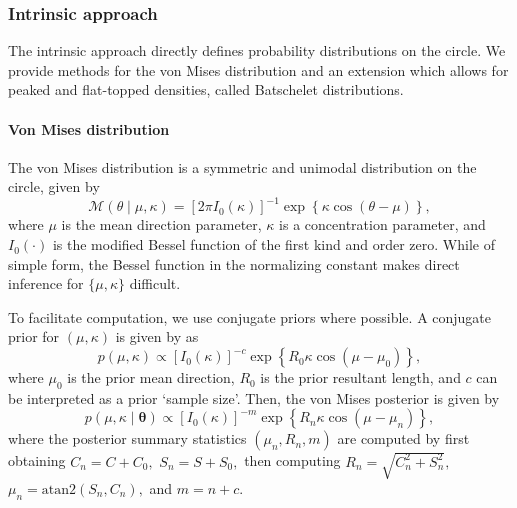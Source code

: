 \documentclass{article}
\begin{document}
\hypertarget{intrinsic-approach}{%
	\subsubsection{Intrinsic approach}\label{intrinsic-approach}}

\label{sec:intrinsic}

The intrinsic approach directly defines probability distributions on the
circle. We provide methods for the von Mises distribution and an
extension which allows for peaked and flat-topped densities, called
Batschelet distributions.

\hypertarget{von-mises-distribution}{%
	\paragraph{Von Mises distribution}\label{von-mises-distribution}}

\label{vonmisespost}

The von Mises distribution is a symmetric and unimodal distribution on
the circle, given by \begin{equation}
\mathcal{M}(\theta \mid \mu, \kappa) = [2 \pi I_0(\kappa)]^{-1} \exp \left\{ \kappa \cos(\theta - \mu) \right\},
\end{equation} where \(\mu\) is the mean direction parameter, \(\kappa\)
is a concentration parameter, and \(I_0(\cdot)\) is the modified Bessel
function of the first kind and order zero. While of simple form, the
Bessel function in the normalizing constant makes direct inference for
\(\{\mu, \kappa\}\) difficult.

To facilitate computation, we use conjugate priors where possible. A
conjugate prior for \((\mu, \kappa)\) is given by
\citet{guttorp1988finding} as \begin{equation} \label{eqn:vmconjprior}
p(\mu, \kappa) \propto [I_0(\kappa)]^{-c}  \exp \left\{ R_0 \kappa \cos(\mu - \mu_0) \right\},
\end{equation} where \(\mu_0\) is the prior mean direction, \(R_0\) is
the prior resultant length, and \(c\) can be interpreted as a prior
`sample size'. Then, the von Mises posterior is given by
\begin{equation}
p(\mu, \kappa \mid \boldsymbol{\theta}) \propto [I_0(\kappa)]^{-m}  \exp \left\{ R_n \kappa \cos(\mu - \mu_n) \right\},
\end{equation} where the posterior summary statistics
\((\mu_n, R_n, m)\) are computed by first obtaining \(C_n = C + C_0,\)
\(S_n = S + S_0,\) then computing \(R_n = \sqrt{C_n^2 + S_n^2},\)
\(\mu_n = \text{atan2}(S_n, C_n),\) and \(m = n + c\).
\end{document}

